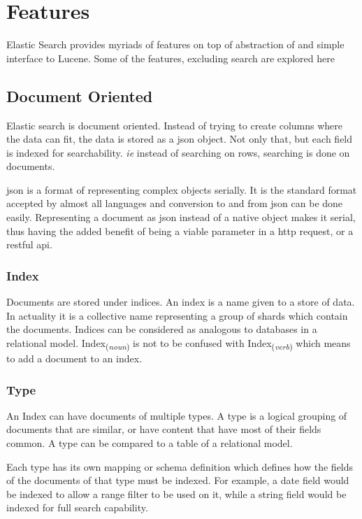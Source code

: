 \documentclass[12pt]{article}
\begin{document}
	\section{Features}
		Elastic Search provides myriads of features on top of abstraction of and simple interface to Lucene. Some of the features, excluding search are explored here

		\subsection{Document Oriented}
			Elastic search is document oriented. Instead of trying to create columns where the data can fit, the data is stored as a \ac{json} object. Not only that, but each field is indexed for searchability. \emph{ie} instead of searching on rows, searching is done on documents.\cite{book}

			\ac{json} is a format of representing complex objects serially. It is the standard format accepted by almost all languages and conversion to and from \ac{json} can be done easily. Representing a document as \ac{json} instead of a native object makes it serial, thus having the added benefit of being a viable parameter in a \ac{http} request, or a \ac{rest}ful \ac{api}.

			\subsubsection{Index}
			Documents are stored under indices. An index is a name given to a store of data. In actuality it is a collective name representing a group of shards which contain the documents. Indices can be considered as analogous to databases in a relational model. Index\textsubscript{(\emph{noun})} is not to be confused with Index\textsubscript{(\emph{verb})} which means to add a document to an index.

			\subsubsection{Type}
			An Index can have documents of multiple types. A type is a logical grouping of documents that are similar, or have content that have most of their fields common. A type can be compared to a table of a relational model. 

			Each type has its own mapping or schema definition which defines how the fields of the documents of that type must be indexed. For example, a date field would be indexed to allow a range filter to be used on it, while a string field would be indexed for full search capability.
\end{document}
